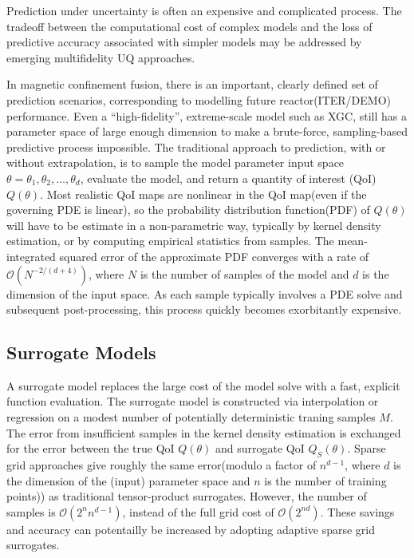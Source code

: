 %
%

Prediction under uncertainty is often an expensive and complicated process\cite{odensiam1,odensiam2}.
The tradeoff between the computational cost of complex models and the loss of predictive accuracy 
associated with simpler models may be addressed by emerging multifidelity UQ approaches\cite{ngmulti,Pehermulti}.

In magnetic confinement fusion, there is an important, clearly defined set of prediction scenarios, corresponding 
to modelling future reactor(ITER/DEMO) performance.  Even a ``high-fidelity'', extreme-scale model such as XGC, still
has a parameter space of large enough dimension to make a brute-force, 
sampling-based predictive process
impossible.  
The traditional approach to prediction, with or without extrapolation, is to sample the model parameter input space
$\theta=\theta_1,\theta_2, \ldots, \theta_d$, evaluate the model, and return a quantity of interest (QoI) $Q(\theta)$.
Most realistic QoI maps are nonlinear in the QoI map(even if the governing PDE is linear), 
so the probability distribution function(PDF) of $Q(\theta)$ will
have to be estimate in a non-parametric way, typically
 by kernel density estimation, or by computing empirical 
statistics from samples.
The mean-integrated squared error
of the approximate PDF converges with a rate of $\mathcal{O}(N^{-2/(d+4)})$, where $N$ is the number of samples of the model
and $d$ is the dimension of the input space.  As each sample typically involves a PDE solve and subsequent post-processing,
this process quickly becomes exorbitantly expensive.  

\subsection{Surrogate Models}

A surrogate model replaces the large cost of the model solve 
with a fast, explicit function evaluation.  The surrogate model
is constructed via interpolation or regression on a modest number 
of potentially deterministic traning samples $M$.  The
error from insufficient samples in the kernel density estimation is exchanged for the error between the true QoI $Q(\theta)$ and surrogate QoI $Q_S(\theta)$\cite{butler2013propagation}.
Sparse grid approaches \cite{bungartz2004,Jakeman2011LocalAD} give roughly the same error(modulo a factor of $n^{d-1}$, where $d$ is the dimension of the (input) parameter space and $n$ is the number of
training points)) as traditional tensor-product surrogates.
However, the number of samples is  $\mathcal{O}(2^n n^{d-1})$, instead of the full grid cost of $\mathcal{O}(2^{nd})$.  
These savings and accuracy can potentailly be increased by adopting adaptive sparse grid surrogates\cite{bungartz2004}.

